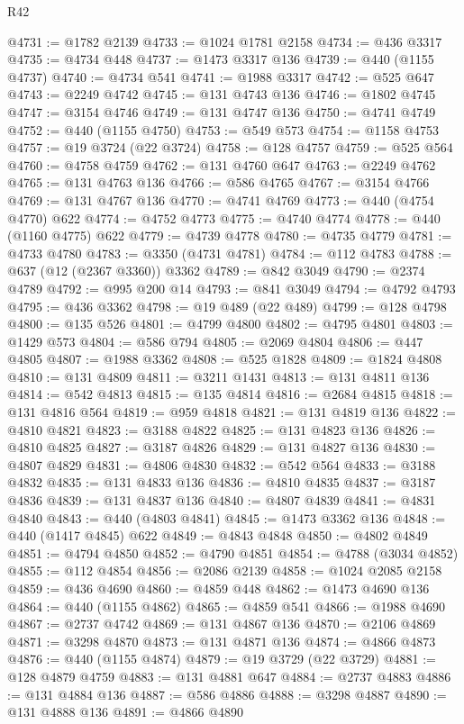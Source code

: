 \begin{lexlean}{R42}
\begin{coremodule}
@4731 := @1782 @2139
@4733 := @1024 @1781 @2158
@4734 := @436 @3317
@4735 := @4734 @448
@4737 := @1473 @3317 @136
@4739 := @440 (@1155 @4737)
@4740 := @4734 @541
@4741 := @1988 @3317
@4742 := @525 @647
@4743 := @2249 @4742
@4745 := @131 @4743 @136
@4746 := @1802 @4745
@4747 := @3154 @4746
@4749 := @131 @4747 @136
@4750 := @4741 @4749
@4752 := @440 (@1155 @4750)
@4753 := @549 @573
@4754 := @1158 @4753
@4757 := @19 @3724 (@22 @3724)
@4758 := @128 @4757
@4759 := @525 @564
@4760 := @4758 @4759
@4762 := @131 @4760 @647
@4763 := @2249 @4762
@4765 := @131 @4763 @136
@4766 := @586 @4765
@4767 := @3154 @4766
@4769 := @131 @4767 @136
@4770 := @4741 @4769
@4773 := @440 (@4754 @4770) @622
@4774 := @4752 @4773
@4775 := @4740 @4774
@4778 := @440 (@1160 @4775) @622
@4779 := @4739 @4778
@4780 := @4735 @4779
@4781 := @4733 @4780
@4783 := @3350 (@4731 @4781)
@4784 := @112 @4783
@4788 := @637 (@12 (@2367 @3360)) @3362
@4789 := @842 @3049
@4790 := @2374 @4789
@4792 := @995 @200 @14
@4793 := @841 @3049
@4794 := @4792 @4793
@4795 := @436 @3362
@4798 := @19 @489 (@22 @489)
@4799 := @128 @4798
@4800 := @135 @526
@4801 := @4799 @4800
@4802 := @4795 @4801
@4803 := @1429 @573
@4804 := @586 @794
@4805 := @2069 @4804
@4806 := @447 @4805
@4807 := @1988 @3362
@4808 := @525 @1828
@4809 := @1824 @4808
@4810 := @131 @4809
@4811 := @3211 @1431
@4813 := @131 @4811 @136
@4814 := @542 @4813
@4815 := @135 @4814
@4816 := @2684 @4815
@4818 := @131 @4816 @564
@4819 := @959 @4818
@4821 := @131 @4819 @136
@4822 := @4810 @4821
@4823 := @3188 @4822
@4825 := @131 @4823 @136
@4826 := @4810 @4825
@4827 := @3187 @4826
@4829 := @131 @4827 @136
@4830 := @4807 @4829
@4831 := @4806 @4830
@4832 := @542 @564
@4833 := @3188 @4832
@4835 := @131 @4833 @136
@4836 := @4810 @4835
@4837 := @3187 @4836
@4839 := @131 @4837 @136
@4840 := @4807 @4839
@4841 := @4831 @4840
@4843 := @440 (@4803 @4841)
@4845 := @1473 @3362 @136
@4848 := @440 (@1417 @4845) @622
@4849 := @4843 @4848
@4850 := @4802 @4849
@4851 := @4794 @4850
@4852 := @4790 @4851
@4854 := @4788 (@3034 @4852)
@4855 := @112 @4854
@4856 := @2086 @2139
@4858 := @1024 @2085 @2158
@4859 := @436 @4690
@4860 := @4859 @448
@4862 := @1473 @4690 @136
@4864 := @440 (@1155 @4862)
@4865 := @4859 @541
@4866 := @1988 @4690
@4867 := @2737 @4742
@4869 := @131 @4867 @136
@4870 := @2106 @4869
@4871 := @3298 @4870
@4873 := @131 @4871 @136
@4874 := @4866 @4873
@4876 := @440 (@1155 @4874)
@4879 := @19 @3729 (@22 @3729)
@4881 := @128 @4879 @4759
@4883 := @131 @4881 @647
@4884 := @2737 @4883
@4886 := @131 @4884 @136
@4887 := @586 @4886
@4888 := @3298 @4887
@4890 := @131 @4888 @136
@4891 := @4866 @4890

\end{coremodule}
\end{lexlean}
